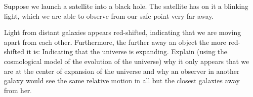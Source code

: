 \documentclass[12pt]{exam}
\begin{document}
\begin{questions}
\question Suppose we launch a satellite into a black hole. The satellite has on it a blinking light, which we are able to observe from our safe point very far away.




\clearpage
	
\question Light from distant galaxies appears red-shifted, indicating that we are moving apart from each other. Furthermore, the further away an object the more red-shifted it is: Indicating that the universe is expanding. Explain (using the cosmological model of the evolution of the universe) why it only appears that we are at the center of expansion of the universe and why an observer in another galaxy would see the same relative motion in all but the closest galaxies away from her.


\end{questions}
\end{document}
